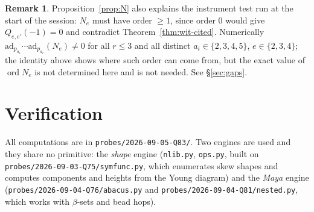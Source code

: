\documentclass[11pt]{article}
\theoremstyle{definition}
\newtheorem{remark}[theorem]{Remark}
\DeclareMathOperator{\ord}{ord}
\begin{document}
\begin{remark}
Proposition~\ref{prop:N} also explains the instrument test run at the start of the session:
$N_e$ must have order $\ge1$, since order $0$ would give $Q_{e,e'}(-1)=0$ and contradict
Theorem~\ref{thm:wit-cited}.  Numerically $\mathrm{ad}_{p_{a_1}}\!\cdots\mathrm{ad}_{p_{a_r}}(N_e)\ne0$
for all $r\le3$ and all distinct $a_i\in\{2,3,4,5\}$, $e\in\{2,3,4\}$; the identity above shows
where such order can come from, but the exact value of $\ord N_e$ is not determined here and is
not needed.  See \S\ref{sec:gaps}.
\end{remark}

\section{Verification}

All computations are in \texttt{probes/2026-09-05-Q83/}.  Two engines are used and they share
no primitive: the \emph{shape} engine (\texttt{nlib.py}, \texttt{ops.py}, built on
\texttt{probes/2026-09-03-Q75/symfunc.py}, which enumerates skew shapes and computes components
and heights from the Young diagram) and the \emph{Maya} engine
(\texttt{probes/2026-09-04-Q76/abacus.py} and \texttt{probes/2026-09-04-Q81/nested.py}, which
works with $\beta$-sets and bead hops).
\end{document}
